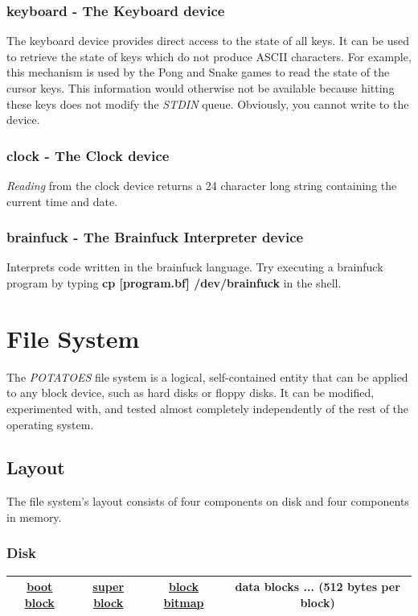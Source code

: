\documentclass[11pt,a4paper]{scrartcl}
\begin{document}
\subsubsection{keyboard - The Keyboard device}
The keyboard device provides direct access to the state of all keys. It can be used to retrieve the state of keys which do not produce ASCII characters. For example, this mechanism is used by the Pong and Snake games to read the state of the cursor keys. This information would otherwise not be available because hitting these keys does not modify the \textit{STDIN} queue. Obviously, you cannot write to the device.

\subsubsection{clock - The Clock device}
\textit{Reading} from the clock device returns a 24 character long string containing the current time and date.

\subsubsection{brainfuck - The Brainfuck Interpreter device}
Interprets code written in the brainfuck language. Try executing a brainfuck program by typing \textbf{cp [program.bf] /dev/brainfuck} in the shell.
\pagebreak

\section{File System}

The \textit{POTATOES} file system is a logical, self-contained entity that can be applied to any block device, such as hard disks or floppy disks.
It can be modified, experimented with, and tested almost completely independently of the rest of the operating system.

\subsection{Layout}
The file system's layout consists of four components on disk and four components in memory.

\subsubsection{Disk}
\begin{tabular}{|c|c|c|c|}
\hline
\hyperlink{bootblock}{boot block} & \hyperlink{superblock}{super block} & \hyperlink{blockbitmap}{block bitmap} & data blocks ... (512 bytes per block)\\
\hline
\end{tabular}
\end{document}
